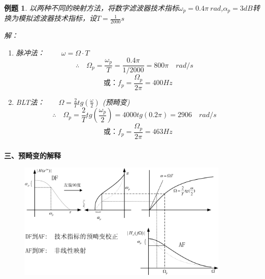 \documentclass[notheorems,compress,mathserif,table]{beamer}
\newtheorem{example}{例题}
\begin{document}
\begin{frame}[shrink]\frametitle{}%
\begin{example} 以两种不同的映射方法，将数字滤波器技术指标$\omega_p$$=0.4\pi\ rad$,$\alpha_p$$ = 3dB$转换为模拟滤波器技术指标，设$T = \frac{1}{2000}s$
\par   解：
   \begin{enumerate}
     \item 脉冲法：  $\quad\quad \omega = \Omega \cdot T $
     $$\therefore\quad \Omega_p = \frac{\omega_p}{T} =
       \frac{0.4\pi}{1/2000} = 800\pi\quad rad/s \quad$$
     $$  \mbox{或：} f_p = \frac{\Omega_p}{2\pi}= 400Hz$$
     \item BLT法：$\quad\quad\Omega = \frac{2}{T}tg(\frac{\omega}{2}) $  \quad (预畸变)
     $$\therefore\quad \Omega_p = \frac{2}{T}tg(\frac{\omega_p}{2})
       =4000tg(0.2\pi) = 2906\quad rad/s \quad$$
     $$  \mbox{或：} f_p = \frac{\Omega_p}{2\pi}= 463Hz$$

   \end{enumerate}

\end{example}
\end{frame}


\begin{frame}[shrink]\frametitle{}%
\textbf{三、预畸变的解释}%

\begin{figure}[h]
\centering
\includegraphics[width=0.9\textwidth]{fig22_BLT_yujibian.jpg}
\label{}
\end{figure}
\end{frame}
\end{document}
